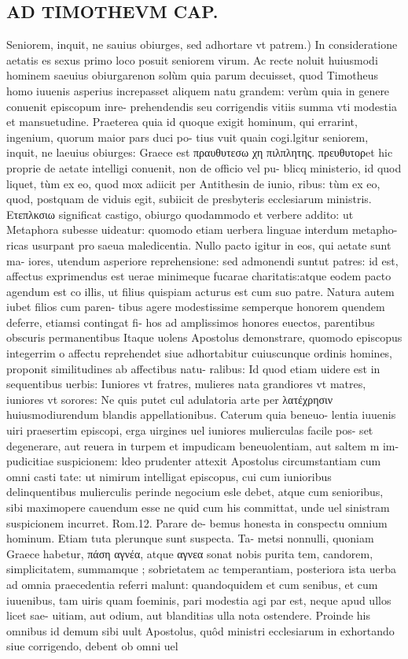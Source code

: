 \documentclass{article}
\begin{document}
\begin{pages}
\section*{AD TIMOTHEVM CAP. }
\marginpar{[ p.103 ]}\pstart Seniorem, inquit, ne sauius obiurges, sed adhortare vt patrem.) In consideratione aetatis es sexus primo loco posuit seniorem virum. Ac recte noluit huiusmodi hominem saeuius obiurgarenon solùm quia parum decuisset, quod Timotheus homo iuuenis asperius increpasset aliquem natu grandem: verùm quia in genere conuenit episcopum inre- prehendendis seu corrigendis vitiis summa vti modestia et mansuetudine. Praeterea quia id quoque exigit hominum, qui errarint, ingenium, quorum maior pars duci po- tius vuit quain cogi.lgitur seniorem, inquit, ne laeuius obiurges: Graece est πραυθυτεσω χη πιλπλητης. πρευθυτορet hic proprie de aetate intelligi conuenit, non de officio vel pu- blicq ministerio, id quod liquet, tùm ex eo, quod mox adiicit per Antithesin de iunio, ribus: tùm ex eo, quod, postquam de viduis egit, subiicit de presbyteris ecclesiarum ministris. Ετεπλκσιω significat castigo, obiurgo quodammodo et verbere addito: ut Metaphora subesse uideatur: quomodo etiam uerbera linguae interdum metapho- ricas usurpant pro saeua maledicentia. Nullo pacto igitur in eos, qui aetate sunt ma- iores, utendum asperiore reprehensione: sed admonendi suntut patres: id est, affectus exprimendus est uerae minimeque fucarae charitatis:atque eodem pacto agendum est co illis, ut filius quispiam acturus est cum suo patre. Natura autem iubet filios cum paren- tibus agere modestissime semperque honorem quendem deferre, etiamsi contingat fi- hos ad amplissimos honores euectos, parentibus obscuris permanentibus Itaque uolens Apostolus demonstrare, quomodo episcopus integerrim o affectu reprehendet siue adhortabitur cuiuscunque ordinis homines, proponit similitudines ab affectibus natu- ralibus: Id quod etiam uidere est in sequentibus uerbis: Iuniores vt fratres, mulieres nata grandiores vt matres, iuniores vt sorores: Ne quis putet cul adulatoria arte per λατέχρησιν huiusmodiurendum blandis appellationibus. Caterum quia beneuo- lentia iuuenis uiri praesertim episcopi, erga uirgines uel iuniores mulierculas facile pos- set degenerare, aut reuera in turpem et impudicam beneuolentiam, aut saltem m im- pudicitiae suspicionem: ldeo prudenter attexit Apostolus circumstantiam cum omni casti tate: ut nimirum intelligat episcopus, cui cum iunioribus delinquentibus mulierculis perinde negocium esle debet, atque cum senioribus, sibi maximopere cauendum esse ne quid cum his committat, unde uel sinistram suspicionem incurret. Rom.12. Parare de- bemus honesta in conspectu omnium hominum. Etiam tuta plerunque sunt suspecta. Ta- metsi nonnulli, quoniam Graece habetur, πάση αγνέα, atque αγνεα sonat nobis purita tem, candorem, simplicitatem, summamque ; sobrietatem ac temperantiam, posteriora ista uerba ad omnia praecedentia referri malunt: quandoquidem et cum senibus, et cum iuuenibus, tam uiris quam foeminis, pari modestia agi par est, neque apud ullos licet sae- uitiam, aut odium, aut blanditias ulla nota ostendere. Proinde his omnibus id demum sibi uult Apostolus, quôd ministri ecclesiarum in exhortando siue corrigendo, debent ob omni uel 
\end{pages}
\end{document}
